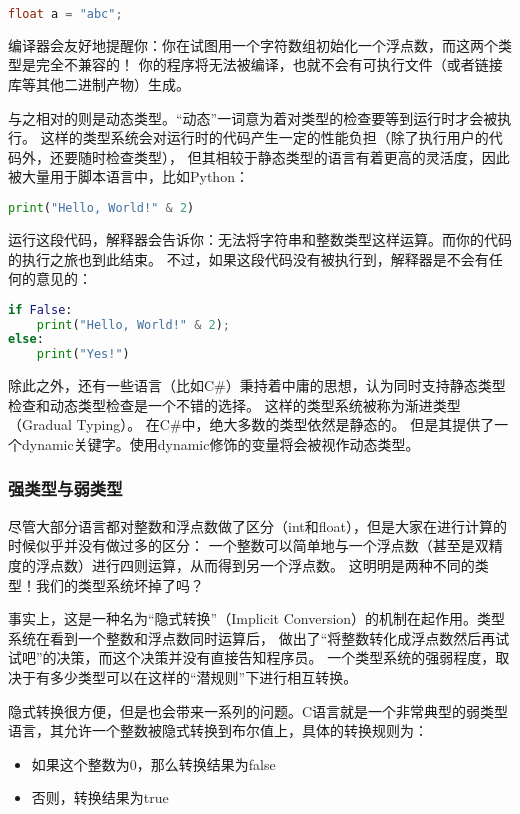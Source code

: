 \documentclass[../main.tex]{subfiles}
\begin{document}
\begin{lstlisting}[language=c]
float a = "abc";
\end{lstlisting}

  \indent 编译器会友好地提醒你：你在试图用一个字符数组初始化一个浮点数，而这两个类型是完全不兼容的！
  你的程序将无法被编译，也就不会有可执行文件（或者链接库等其他二进制产物）生成。

  \indent 与之相对的则是动态类型。“动态”一词意为着对类型的检查要等到运行时才会被执行。
  这样的类型系统会对运行时的代码产生一定的性能负担（除了执行用户的代码外，还要随时检查类型），
  但其相较于静态类型的语言有着更高的灵活度，因此被大量用于脚本语言中，比如Python：

\begin{lstlisting}[language=python]
print("Hello, World!" & 2)
\end{lstlisting}

  运行这段代码，解释器会告诉你：无法将字符串和整数类型这样运算。而你的代码的执行之旅也到此结束。
  不过，如果这段代码没有被执行到，解释器是不会有任何的意见的：

\begin{lstlisting}[language=python]
if False:
	print("Hello, World!" & 2);
else:
	print("Yes!")
\end{lstlisting}

  \indent 除此之外，还有一些语言（比如C\#）秉持着中庸的思想，认为同时支持静态类型检查和动态类型检查是一个不错的选择。
  这样的类型系统被称为渐进类型（Gradual Typing）。 \cite{gradualwiki} 在C\#中，绝大多数的类型依然是静态的。
  但是其提供了一个dynamic关键字。使用dynamic修饰的变量将会被视作动态类型。

  \subsubsection*{强类型与弱类型}
  \indent 尽管大部分语言都对整数和浮点数做了区分（int和float），但是大家在进行计算的时候似乎并没有做过多的区分：
  一个整数可以简单地与一个浮点数（甚至是双精度的浮点数）进行四则运算，从而得到另一个浮点数。
  这明明是两种不同的类型！我们的类型系统坏掉了吗？

  \indent 事实上，这是一种名为“隐式转换”（Implicit Conversion）的机制在起作用。类型系统在看到一个整数和浮点数同时运算后，
  做出了“将整数转化成浮点数然后再试试吧”的决策，而这个决策并没有直接告知程序员。
  一个类型系统的强弱程度，取决于有多少类型可以在这样的“潜规则”下进行相互转换。

  \indent 隐式转换很方便，但是也会带来一系列的问题。C语言就是一个非常典型的弱类型语言，其允许一个整数被隐式转换到布尔值上，具体的转换规则为：
  \begin{itemize}
    \item 如果这个整数为0，那么转换结果为false
    \item 否则，转换结果为true
  \end{itemize}
\end{document}
